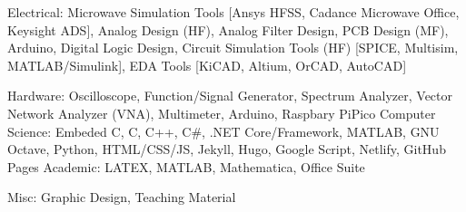 

\begin{cvskills}

  \cvskill
    {Electrical:} %
    {Microwave Simulation Tools [Ansys HFSS, Cadance Microwave Office, Keysight ADS], Analog Design (HF), Analog Filter Design, PCB Design (MF), Arduino, Digital Logic Design, Circuit Simulation Tools (HF) [SPICE, Multisim, MATLAB/Simulink], EDA Tools [KiCAD, Altium, OrCAD, AutoCAD]} %

\cvskill
    {Hardware:}
    {Oscilloscope, Function/Signal Generator, Spectrum Analyzer, Vector Network Analyzer (VNA), Multimeter, Arduino, Raspbary PiPico }
  \cvskill
    {Computer Science:} %
    {Embeded C, C, C++, C\#, .NET Core/Framework, MATLAB, GNU Octave, Python, HTML/CSS/JS, Jekyll, Hugo, Google Script, Netlify, GitHub Pages} %
  \cvskill
    {Academic:} %
    {LATEX, MATLAB, Mathematica, Office Suite} %


  \cvskill
    {Misc:} %
    {Graphic Design, Teaching Material} %
\end{cvskills}